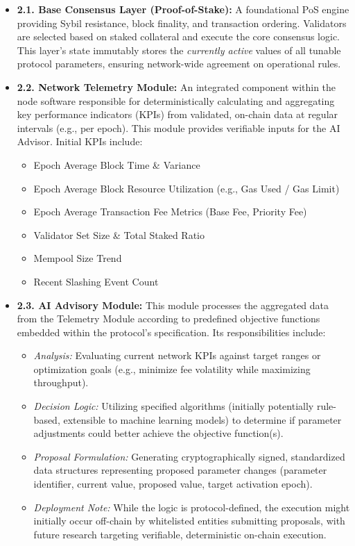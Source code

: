 \documentclass[11pt]{article}
\begin{document}
\begin{itemize}
    \item \textbf{2.1. Base Consensus Layer (Proof-of-Stake):} A foundational PoS engine providing Sybil resistance, block finality, and transaction ordering. Validators are selected based on staked collateral and execute the core consensus logic. This layer's state immutably stores the \textit{currently active} values of all tunable protocol parameters, ensuring network-wide agreement on operational rules.
    
    \item \textbf{2.2. Network Telemetry Module:} An integrated component within the node software responsible for deterministically calculating and aggregating key performance indicators (KPIs) from validated, on-chain data at regular intervals (e.g., per epoch). This module provides verifiable inputs for the AI Advisor. Initial KPIs include:
        \begin{itemize}
            \item Epoch Average Block Time \& Variance
            \item Epoch Average Block Resource Utilization (e.g., Gas Used / Gas Limit)
            \item Epoch Average Transaction Fee Metrics (Base Fee, Priority Fee)
            \item Validator Set Size \& Total Staked Ratio
            \item Mempool Size Trend
            \item Recent Slashing Event Count
        \end{itemize}
        
    \item \textbf{2.3. AI Advisory Module:} This module processes the aggregated data from the Telemetry Module according to predefined objective functions embedded within the protocol's specification. Its responsibilities include:
        \begin{itemize}
            \item \textit{Analysis:} Evaluating current network KPIs against target ranges or optimization goals (e.g., minimize fee volatility while maximizing throughput).
            \item \textit{Decision Logic:} Utilizing specified algorithms (initially potentially rule-based, extensible to machine learning models) to determine if parameter adjustments could better achieve the objective function(s).
            \item \textit{Proposal Formulation:} Generating cryptographically signed, standardized data structures representing proposed parameter changes (parameter identifier, current value, proposed value, target activation epoch).
            \item \textit{Deployment Note:} While the logic is protocol-defined, the execution might initially occur off-chain by whitelisted entities submitting proposals, with future research targeting verifiable, deterministic on-chain execution.
        \end{itemize}
        

\end{itemize}
\end{document}
